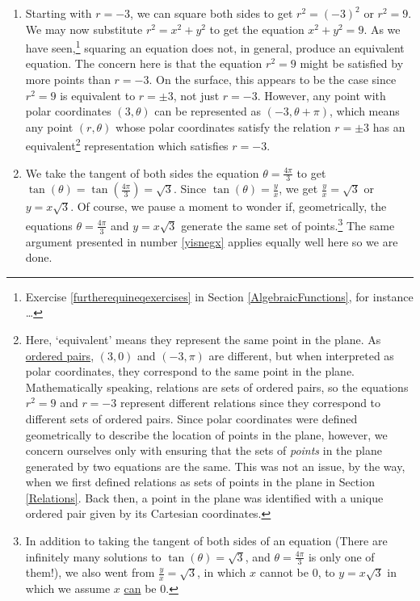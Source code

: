 \begin{ex}
\begin{enumerate}
\begin{enumerate}
\item Starting with $r = -3$, we can square both sides to get  $r^2 = (-3)^2$ or $r^2 = 9$.  We may now substitute $r^2 = x^2+y^2$ to get the equation $x^2+y^2 = 9$.  As we have seen,\footnote{Exercise \ref{furtherequineqexercises} in Section \ref{AlgebraicFunctions}, for instance \ldots} squaring an equation does not, in general, produce an equivalent equation.  The concern here is that the equation $r^2 = 9$ might be satisfied by more points than $r = -3$.  On the surface, this appears to be the case since $r^2 = 9$ is equivalent to $r = \pm 3$, not just $r=-3$.  However, any point with polar coordinates $(3,\theta)$ can be represented as $(-3,\theta + \pi)$, which means any point $(r,\theta)$ whose polar coordinates satisfy the relation $r = \pm 3$ has an equivalent\footnote{Here, `equivalent' means they represent the same point in the plane.  As \underline{ordered pairs}, $(3,0)$ and $(-3,\pi)$ are different,  but when interpreted as polar coordinates, they correspond to the same point in the plane.  Mathematically speaking, relations are sets of ordered pairs, so the equations $r^2 = 9$ and $r=-3$ represent different relations since they correspond to different sets of ordered pairs.  Since polar coordinates were defined geometrically to describe the location of points in the plane, however, we concern ourselves only with ensuring that the sets of \textit{points} in the plane generated by two equations are the same.  This was not an issue, by the way, when we first defined relations as sets of points in the plane in Section \ref{Relations}.  Back then, a point in the plane was identified with a unique ordered pair given by its Cartesian coordinates.} representation which satisfies $r=-3$.

\item  We take the tangent of both sides the equation $\theta = \frac{4\pi}{3}$ to get $\tan(\theta) = \tan\left(\frac{4\pi}{3}\right) = \sqrt{3}$.  Since $\tan(\theta) = \frac{y}{x}$, we get $\frac{y}{x} = \sqrt{3}$ or $y = x\sqrt{3}$.  Of course, we pause a moment to wonder if, geometrically, the equations $\theta = \frac{4\pi}{3}$ and $y = x\sqrt{3}$ generate the same set of points.\footnote{In addition to taking the tangent of both sides of an equation (There are infinitely many solutions to $\tan(\theta) = \sqrt{3}$, and $\theta = \frac{4\pi}{3}$ is only one of them!), we also went from $\frac{y}{x} = \sqrt{3}$, in which $x$ cannot be $0$, to $y = x\sqrt{3}$ in which we assume $x$ \underline{can} be $0$.}  The same argument presented in number \ref{yisnegx} applies equally well here so we are done.


\end{enumerate}
\end{enumerate}
\end{ex}
